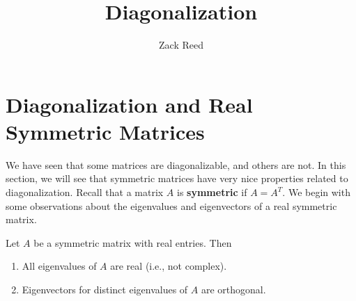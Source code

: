 \documentclass{ximera}
\author{Zack Reed}
\title{Diagonalization}
\begin{document}
\begin{abstract}

\end{abstract}
\maketitle

\section*{Diagonalization and Real Symmetric Matrices}

We have seen that some matrices are diagonalizable, and others are not. In this section, we will see that
symmetric matrices have very nice properties related to diagonalization. Recall that a matrix $A$ is
\textbf{symmetric} if $A=A^T$. We begin with some observations
about the eigenvalues and eigenvectors of a real symmetric matrix.

\begin{proposition}
  Let $A$ be a symmetric matrix with real entries. Then

    \begin{enumerate}
    \item All eigenvalues of $A$ are real (i.e., not complex).
    \item Eigenvectors for distinct eigenvalues of $A$ are orthogonal.
    \end{enumerate}

\end{proposition}
\end{document}
